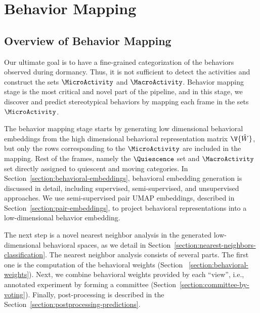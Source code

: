 \setlength{\parindent}{0pt}
\chapter{Behavior Mapping}\label{chapter:behavior-mapping}
\section{Overview of Behavior Mapping}
Our ultimate goal is to have a fine-grained categorization of the behaviors observed during dormancy. Thus, it is not sufficient to detect the activities and construct the sets $\MicroActivity$ and $\MacroActivity$. Behavior mapping stage is the most critical and novel part of the pipeline, and in this stage, we discover and predict stereotypical behaviors by mapping each frame in the sets $\MicroActivity$.

The behavior mapping stage starts by generating low dimensional behavioral embeddings from the high dimensional behavioral representation matrix $\V{\hat{W}}$, but only the rows corresponding to the $\MicroActivity$ are included in the mapping.
Rest of the frames, namely the $\Quiescence$ set and $\MacroActivity$ set directly assigned to quiescent and moving categories.
In Section~\ref{section:behavioral-embeddings}, behavioral embedding generation is discussed in detail, including supervised, semi-supervised, and unsupervised approaches.
We use semi-supervised pair UMAP embeddings, described in Section~\ref{section:pair-embeddings}, to project behavioral representations into a low-dimensional behavior embedding.

The next step is a novel nearest neighbor analysis in the generated low-dimensional behavioral spaces, as we detail in Section~\ref{section:nearest-neighbors-classification}.
The nearest neighbor analysis consists of several parts.
The first one is the computation of the behavioral weights (Section ~\ref{section:behavioral-weights}).
Next, we combine behavioral weights provided by each ``view'', i.e., annotated experiment by forming a committee (Section~\ref{section:committee-by-voting}).
Finally, post-processing is described in the Section~\ref{section:postprocessing-predictions}.

